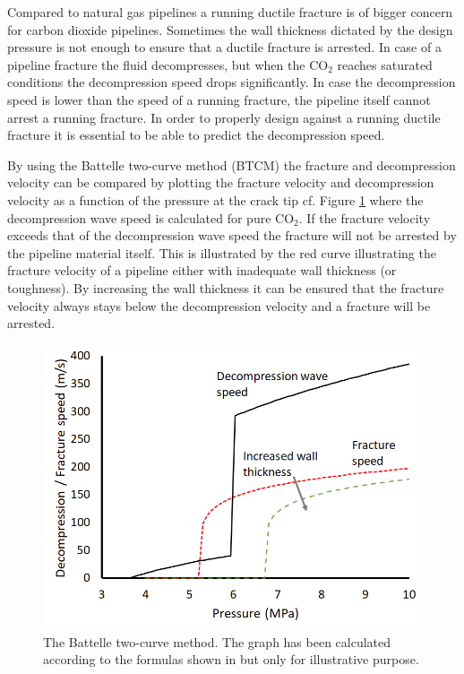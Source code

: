 \documentclass[a4paper, 10pt, twocolumn, twoside]{scrartcl}
\begin{document}
Compared to natural gas pipelines a running ductile fracture is of bigger concern for carbon dioxide pipelines. Sometimes the wall thickness dictated by the design pressure is not enough to ensure that a ductile fracture is arrested. In case of a pipeline fracture the fluid decompresses, but when the CO$_2$ reaches saturated conditions the decompression speed drops significantly. In case the decompression speed is lower than the speed of a running fracture, the pipeline itself cannot arrest a running fracture. In order to properly design against a running ductile fracture it is essential to be able to predict the decompression speed.     

By using the Battelle two-curve method (BTCM) \cite{EiberMaxeyW.A.BubenikT.A.AmericanGasAssociation.PipelineResearchCommittee.LinePipeResearchSupervisoryCommittee.1993} the fracture and decompression velocity can be compared by plotting the fracture velocity and decompression velocity as a function of the pressure at the crack tip cf. Figure \ref{fig:btcm} where the decompression wave speed is calculated for pure CO$_2$. If the fracture velocity exceeds that of the decompression wave speed the fracture will not be arrested by the pipeline material itself. This is illustrated by the red curve illustrating the fracture velocity of a pipeline either with inadequate wall thickness (or toughness). By increasing the wall thickness it can be ensured that the fracture velocity always stays below the decompression velocity and a fracture will be arrested.    

\begin{figure}[!ht]
	\centering
	\includegraphics[width=\columnwidth]{./Bilder/BTCM.png}
	\caption{The Battelle two-curve method. The graph has been calculated according to the formulas shown in \cite{Hu2021} but only for illustrative purpose.}
	\label{fig:btcm}
\end{figure}
\end{document}
